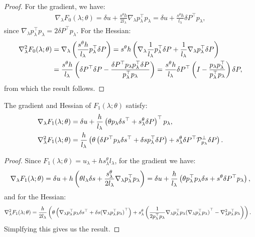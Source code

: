 \documentclass[eikonal.tex]{subfiles}
\begin{document}
\begin{proof}
  For the gradient, we have:
  \begin{align*}
    \nabla_\lambda F_0(\lambda; \theta) = \delta u + \frac{s^{\theta} h}{2 l_\lambda} \nabla_\lambda p_\lambda^\top p_\lambda = \delta u + \frac{s^{\theta} h}{l_\lambda} \delta P^\top p_\lambda,
  \end{align*}
  since
  $\nabla_\lambda p_\lambda^\top p_\lambda = 2 \delta P^\top
  p_\lambda$. For the Hessian:
  \begin{align*}
    \nabla^2_\lambda F_0(\lambda; \theta) &= \nabla_\lambda \left(\frac{s^{\theta} h}{l_\lambda} p_\lambda^\top \delta P\right) = s^{\theta} h \left(\nabla_\lambda \frac{1}{l_\lambda} p_\lambda^\top \delta P + \frac{1}{l_\lambda} \nabla_\lambda p_\lambda^\top \delta P\right) \\
    &= \frac{s^{\theta} h}{l_\lambda} \left(\delta P^\top \delta P - \frac{\delta P^\top p_\lambda p_\lambda^\top \delta P}{p_\lambda^\top p_\lambda}\right) = \frac{s^{\theta} h}{l_\lambda} \delta P^\top \left(I - \frac{p_\lambda p_\lambda^\top}{p_\lambda^\top p_\lambda}\right) \delta P,
  \end{align*}
  from which the result follows.
\end{proof}

\begin{lemma}\label{lemma:F1-grad-and-Hess}
  The gradient and Hessian of $F_1(\lambda; \theta)$ satisfy:
  \begin{align}
    \nabla_\lambda F_1(\lambda; \theta) &= \delta u + \frac{h}{l_\lambda} \left(\theta p_\lambda \delta s^\top + s^{\theta}_\lambda \delta P\right)^\top p_\lambda, \\
    \nabla_\lambda^2 F_1(\lambda; \theta) &= \frac{h}{l_\lambda} \left(\theta \left(\delta P^\top p_\lambda \delta s^\top + \delta s p_\lambda^\top \delta P\right) + s^{\theta}_\lambda \delta P^\top \mathcal{P}^\perp_{p_\lambda} \delta P\right).
  \end{align}
\end{lemma}

\begin{proof}
  Since $F_1(\lambda; \theta) = u_\lambda + h s^{\theta}_\lambda l_\lambda$, for the gradient we have:
  \begin{align*}
    \nabla_\lambda F_1(\lambda; \theta) = \delta u + h \left(\theta l_\lambda \delta s + \frac{s^{\theta}_\lambda}{2l_\lambda} \nabla_\lambda p_\lambda^\top p_\lambda\right) = \delta u + \frac{h}{l_\lambda} \left(\theta p_\lambda^\top p_\lambda \delta s + s^{\theta} \delta P^\top p_\lambda\right),
  \end{align*}
  and for the Hessian:
  \begin{align*}
    \nabla_\lambda^2 F_1(\lambda; \theta) &= \frac{h}{2 l_\lambda} \left(\theta \left(\nabla_\lambda p_\lambda^\top p_\lambda \delta s^\top + \delta s {(\nabla_\lambda p_\lambda^\top p_\lambda)}^\top\right) + s^{\theta}_\lambda \left(\frac{1}{2 p_\lambda^\top p_\lambda} \nabla_\lambda p_\lambda^\top p_\lambda {(\nabla_\lambda p_\lambda^\top p_\lambda)}^\top - \nabla^2_\lambda p_\lambda^\top p_\lambda\right)\right).
  \end{align*}
  Simplfying this gives us the result.
\end{proof}
\end{document}
